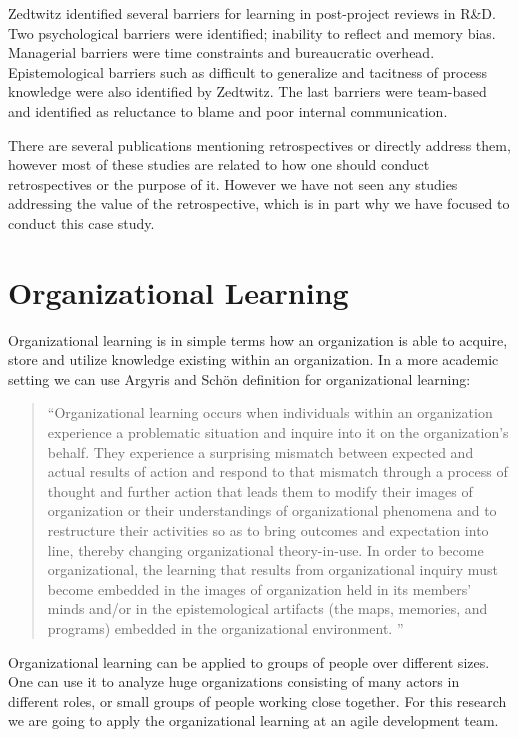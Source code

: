 Zedtwitz\cite{Zedtwitz2002} identified several barriers for learning in post-project reviews in R\&D. Two psychological barriers were identified; inability to reflect and memory bias. Managerial barriers were time constraints and bureaucratic overhead. Epistemological barriers such as difficult to generalize and tacitness of process knowledge were also identified by Zedtwitz. The last barriers were team-based and identified as reluctance to blame and poor internal communication. 

There are several publications mentioning retrospectives or directly address them, however most of these studies are related to how one should conduct retrospectives or the purpose of it. However we have not seen any studies addressing the value of the retrospective, which is in part why we have focused to conduct this case study. 
\clearpage

\section{Organizational Learning}
\label{intro:organizational-learning}
Organizational learning is in simple terms how an organization is able to acquire, store and utilize knowledge existing within an organization. In a more academic setting we can use Argyris and Schön definition \cite{Argyris1996} for organizational learning: 

\begin{quote}
	``Organizational learning occurs when individuals within an organization experience a problematic situation and inquire into it on the organization's behalf. They experience a surprising mismatch between expected and actual results of action and respond to that mismatch through a process of thought and further action that leads them to modify their images of organization or their understandings of organizational phenomena and to restructure their activities so as to bring outcomes and expectation into line, thereby changing organizational theory-in-use. In order to become organizational, the learning that results from organizational inquiry must become embedded in the images of organization held in its members' minds and/or in the epistemological artifacts (the maps, memories, and programs) embedded in the organizational environment. ''
\end{quote}

Organizational learning can be applied to groups of people over different sizes. One can use it to analyze huge organizations consisting of many actors in different roles, or small groups of people working close together. For this research we are going to apply the organizational learning at an agile development team. 

